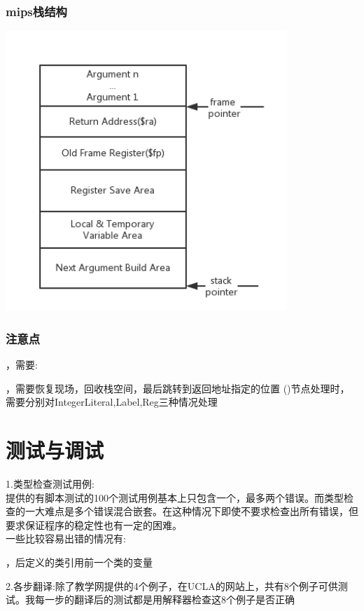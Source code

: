 \documentclass[11pt, oneside]{article}   	%
\begin{document}
\begin{spacing}{1.55}
    \subsubsection{mips栈结构}
    \includegraphics[height=300pt]{3.png}
    \subsubsection{注意点}
    \begin{enumerate}
    ，需要:
    \begin{enumerate}
    \end{enumerate}
    ，需要恢复现场，回收栈空间，最后跳转到返回地址指定的位置
    ()节点处理时，需要分别对IntegerLiteral,Label,Reg三种情况处理
    \end{enumerate}
\section{测试与调试}
    1.类型检查测试用例:\\
    提供的有脚本测试的100个测试用例基本上只包含一个，最多两个错误。而类型检查的一大难点是多个错误混合嵌套。在这种情况下即使不要求检查出所有错误，但要求保证程序的稳定性也有一定的困难。\\
    一些比较容易出错的情况有:
    \begin{enumerate}
    ，后定义的类引用前一个类的变量
    \end{enumerate}
    2.各步翻译:除了教学网提供的4个例子，在UCLA的网站上，共有8个例子可供测试。我每一步的翻译后的测试都是用解释器检查这8个例子是否正确

\end{spacing}
\end{document}

